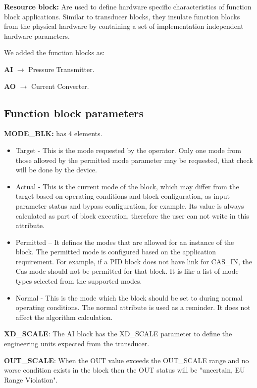 \textbf{Resource block:} Are used to define hardware specific characteristics of function block applications. Similar to transducer blocks, they insulate function blocks from the physical hardware by containing a set of implementation independent hardware parameters.


    
    

We added the function blocks as:

\textbf{AI} $\rightarrow$ Pressure Transmitter.
 
\textbf{AO} $\rightarrow$ Current Converter.

\subsection{Function block parameters}
\textbf{MODE\_BLK:} has 4 elements.
\begin{itemize}
    \item {Target - This is the mode requested by the operator. Only one mode from those allowed by the permitted mode parameter may be requested, that check will be done by the device.}
    \item {Actual - This is the current mode of the block, which may differ from the target based on operating conditions and block configuration, as input parameter status and bypass configuration, for example. Its value is always calculated as part of block execution, therefore the user can not write in this attribute.}
    \item {Permitted – It defines the modes that are allowed for an instance of the block. The permitted mode is configured based on the application requirement. For example, if a PID block does not have link for CAS\_IN, the Cas mode should not be permitted for that block. It is like a list of mode types selected from the supported modes.}
    \item{Normal - This is the mode which the block should be set to during normal operating conditions. The normal attribute is used as a reminder. It does not affect the algorithm calculation.}
   
 \end{itemize}

\textbf{XD\_SCALE}: The AI block has the XD\_SCALE parameter to define the engineering units expected from the transducer.

\textbf{OUT\_SCALE}: When the OUT value exceeds the OUT\_SCALE range and no worse condition exists in the block then the OUT status will be "uncertain, EU Range Violation".

